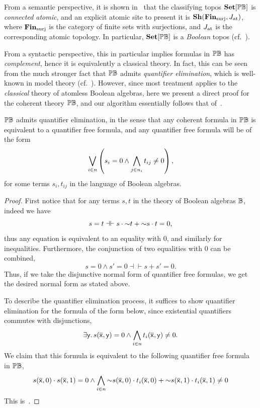 From a semantic perspective, it is shown in~\citet[D3.4.12]{johnstone2002sketches} that the classifying topos $\mathbf{Set}[\mathbb{PB}]$ is \emph{connected atomic}, and an explicit atomic site to present it is $\mathbf{Sh}(\mathbf{Fin}_{\mathrm{surj}},J_{\mathrm{at}})$, where $\mathbf{Fin}_{\mathrm{surj}}$ is the category of finite sets with surjections, and $J_{\mathrm{at}}$ is the corresponding atomic topology. In particular, $\mathbf{Set}[\mathbb{PB}]$ is a \emph{Boolean} topos (cf.~).

From a syntactic perspective, this in particular implies formulas in $\mathbb{PB}$ has \emph{complement}, hence it is equivalently a classical theory. In fact, this can be seen from the much stronger fact that $\mathbb{PB}$ admits \emph{quantifier elimination}, which is well-known in model theory (cf.~\citet{alma991003819279703606}). However, since most treatment applies to the \emph{classical} theory of atomless Boolean algebras, here we present a direct proof for the coherent theory $\mathbb{PB}$, and our algorithm essentially follows that of~\citet{MARRIOTT1996365}.


\begin{theorem}\label{thm:quantifierelimination}
  $\mathbb{PB}$ admits quantifier elimination, in the sense that any coherent formula in $\mathbb{PB}$ is equivalent to a quantifier free formula, and any quantifier free formula will be of the form 
  \[ \bigvee_{i\in n} \left(s_i = 0 \wedge \bigwedge_{j\in n_i} t_{ij} \neq 0\right), \]
  for some terms $s_i,t_{ij}$ in the language of Boolean algebras.
\end{theorem}
\begin{proof}
  First notice that for any terms $s,t$ in the theory of Boolean algebras $\mathbb{B}$, indeed we have
  \[ s = t \dashv\vdash s \cdot \mathord{\sim} t + \mathord{\sim} s \cdot t = 0, \]
  thus any equation is equivalent to an equality with $0$, and similarly for inequalities. Furthermore, the conjunction of two equalities with $0$ can be combined,
  \[ s = 0 \wedge s' = 0 \dashv\vdash s + s' = 0. \]
  Thus, if we take the disjunctive normal form of quantifier free formulas, we get the desired normal form as stated above.

  To describe the quantifier elimination process, it suffices to show quantifier elimination for the formula of the form below, since existential quantifiers commutes with disjunctions,
  \[ \exists\mathsf{y}.\, s(\overline{\mathsf{x}},\mathsf{y}) = 0 \wedge \bigwedge_{i\in n} t_i(\overline{\mathsf{x}},\mathsf{y}) \neq 0. \]
  We claim that this formula is equivalent to the following quantifier free formula in $\mathbb{PB}$,
  \[ s(\overline{\mathsf{x}},0) \cdot s(\overline{\mathsf{x}},1) = 0 \wedge \bigwedge_{i\in n} \mathord{\sim} s(\overline{\mathsf{x}},0) \cdot t_i(\overline{\mathsf{x}},0) + \mathord{\sim} s(\overline{\mathsf{x}},1) \cdot t_i(\overline{\mathsf{x}},1) \neq 0 \]
  This is~\citet[Thm.~6.2]{MARRIOTT1996365}. 
\end{proof}

